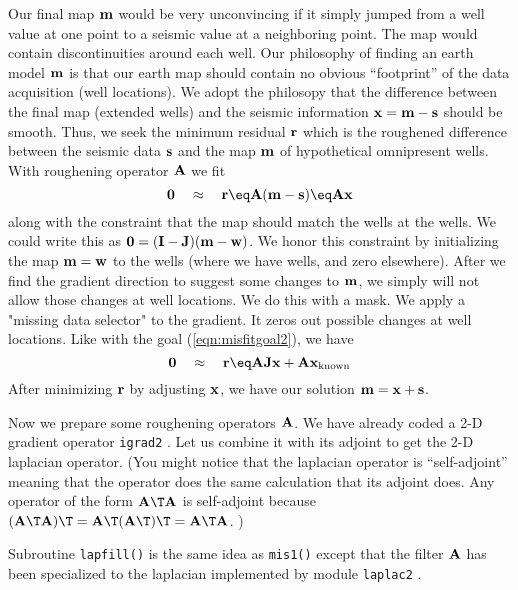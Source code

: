 \par
Our final map $\bold m$ would be very unconvincing if
it simply jumped from a well value at one point
to a seismic value at a neighboring point.
The map would contain discontinuities around each well.
Our philosophy of finding an earth model $\bold m$
is that our earth map should contain no obvious 
``footprint'' of the data acquisition (well locations).
We adopt the philosopy that the difference
between the final map (extended wells)
and the seismic information $\bold x=\bold m-\bold s$ should be smooth.
Thus,
we seek the minimum residual $\bold r$
which is the roughened difference between the seismic data $\bold s$
and the map $\bold m$ of hypothetical omnipresent wells.
With roughening operator $\bold A$ we fit
\begin{equation}
\bold 0\quad\approx\quad \bold r \eq \bold A ( \bold m - \bold s )
	\eq \bold A \bold x
\label{eqn:unconmap}
\end{equation}
along with the constraint
that the map should match the wells at the wells.
We could write this as
$\bold 0 = (\bold I-\bold J) ( \bold m - \bold w )$.
We honor this constraint by initializing the map $\bold m = \bold w$
to the wells (where we have wells, and zero elsewhere).
After we find the gradient direction to suggest some changes
to $\bold m$, we simply will not allow those changes at well locations.
We do this with a mask.
We apply a "missing data selector" to the gradient.
It zeros out possible changes at well locations.
Like with the goal (\ref{eqn:misfitgoal2}),
we have
\begin{equation}
\bold 0\quad\approx\quad \bold r \eq
\bold A \bold J \bold x + \bold A \bold x_{\rm known}
\end{equation}
After minimizing $\bold r$ by adjusting $\bold x$,
we have our solution $ \bold m =  \bold x + \bold s $.

\par
Now we prepare some roughening operators $\bold A$.
We have already coded a 2-D gradient operator
\texttt{igrad2} .
Let us combine it with its adjoint to get the 2-D laplacian operator.
(You might notice that the laplacian operator is ``self-adjoint'' meaning
that the operator does the same calculation that its adjoint does.
Any operator of the form $\bold A\T\bold A$ is self-adjoint because
$(\bold A\T\bold A)\T=\bold A\T (\bold A\T)\T=\bold A\T\bold A$. )
\par
{} 
Subroutine \texttt{lapfill()}
 is the same idea as \texttt{mis1()}
 except that 
the filter $\bold A$ has been specialized to the 
laplacian
implemented by module \texttt{laplac2} . 



